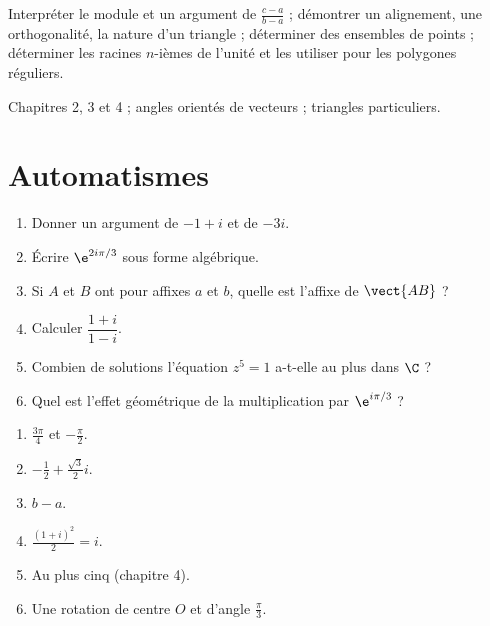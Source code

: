 
\begin{objectives}
Interpréter le module et un argument de $\frac{c-a}{b-a}$ ; démontrer un alignement, une orthogonalité, la nature d'un triangle ; déterminer des ensembles de points ; déterminer les racines $n$-ièmes de l'unité et les utiliser pour les polygones réguliers.
\end{objectives}
\begin{prerequisites}
Chapitres 2, 3 et 4 ; angles orientés de vecteurs ; triangles particuliers.
\end{prerequisites}

\section{Automatismes}
\begin{fluency}
\begin{enumerate}
\item Donner un argument de $-1+i$ et de $-3i$.
\item Écrire $\e^{2i\pi/3}$ sous forme algébrique.
\item Si $A$ et $B$ ont pour affixes $a$ et $b$, quelle est l'affixe de $\vect{AB}$ ?
\item Calculer $\dfrac{1+i}{1-i}$.
\item Combien de solutions l'équation $z^5=1$ a-t-elle au plus dans $\C$ ?
\item Quel est l'effet géométrique de la multiplication par $\e^{i\pi/3}$ ?
\end{enumerate}
\end{fluency}
\begin{solution}[Automatismes]
\begin{enumerate}
\item $\frac{3\pi}4$ et $-\frac\pi2$.
\item $-\frac12+\frac{\sqrt3}2i$.
\item $b-a$.
\item $\frac{(1+i)^2}{2}=i$.
\item Au plus cinq (chapitre 4).
\item Une rotation de centre $O$ et d'angle $\frac\pi3$.
\end{enumerate}
\end{solution}

\mxnewpage
